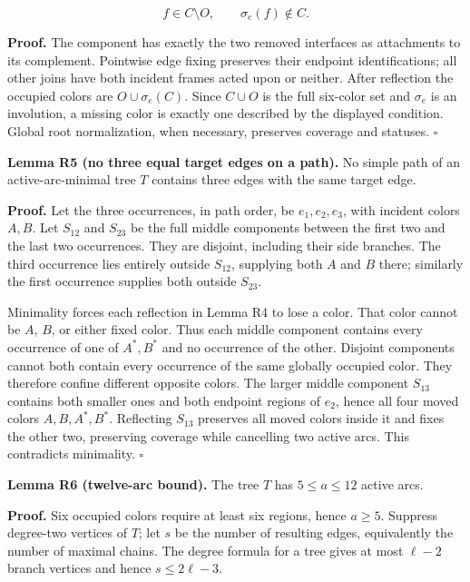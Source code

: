 \documentclass[
  11pt,
]{article}
\begin{document}
\[
f\in C\setminus O,\qquad \sigma_e(f)\notin C.
\]

\textbf{Proof.} The component has exactly the two removed interfaces as
attachments to its complement. Pointwise edge fixing preserves their
endpoint identifications; all other joins have both incident frames
acted upon or neither. After reflection the occupied colors are
\(O\cup\sigma_e(C)\). Since \(C\cup O\) is the full six-color set and
\(\sigma_e\) is an involution, a missing color is exactly one described
by the displayed condition. Global root normalization, when necessary,
preserves coverage and statuses. \(\square\)

\textbf{Lemma R5 (no three equal target edges on a path).} No simple
path of an active-arc-minimal tree \(T\) contains three edges with the
same target edge.

\textbf{Proof.} Let the three occurrences, in path order, be
\(e_1,e_2,e_3\), with incident colors \(A,B\). Let \(S_{12}\) and
\(S_{23}\) be the full middle components between the first two and the
last two occurrences. They are disjoint, including their side branches.
The third occurrence lies entirely outside \(S_{12}\), supplying both
\(A\) and \(B\) there; similarly the first occurrence supplies both
outside \(S_{23}\).

Minimality forces each reflection in Lemma R4 to lose a color. That
color cannot be \(A\), \(B\), or either fixed color. Thus each middle
component contains every occurrence of one of \(A^*,B^*\) and no
occurrence of the other. Disjoint components cannot both contain every
occurrence of the same globally occupied color. They therefore confine
different opposite colors. The larger middle component \(S_{13}\)
contains both smaller ones and both endpoint regions of \(e_2\), hence
all four moved colors \(A,B,A^*,B^*\). Reflecting \(S_{13}\) preserves
all moved colors inside it and fixes the other two, preserving coverage
while cancelling two active arcs. This contradicts minimality.
\(\square\)

\textbf{Lemma R6 (twelve-arc bound).} The tree \(T\) has \(5\le a\le12\)
active arcs.

\textbf{Proof.} Six occupied colors require at least six regions, hence
\(a\ge5\). Suppress degree-two vertices of \(T\); let \(s\) be the
number of resulting edges, equivalently the number of maximal chains.
The degree formula for a tree gives at most \(\ell-2\) branch vertices
and hence \(s\le2\ell-3\).
\end{document}
